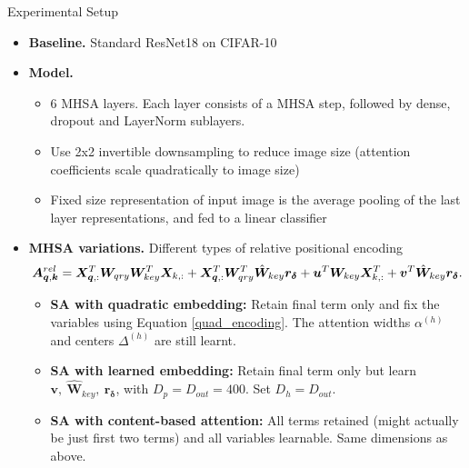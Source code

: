 \documentclass[9pt]{beamer}
\newcommand{\mb}{\bm}
\begin{document}
\begin{frame}{Experimental Setup}
\begin{itemize}
\item \textbf{Baseline.} Standard ResNet18 on CIFAR-10

\vspace{.02in}
\item \textbf{Model.}
\begin{itemize}
    \item 6 MHSA layers. Each layer consists of a MHSA step, followed by dense, dropout and LayerNorm sublayers.
    \item Use 2x2 invertible downsampling to reduce image size (attention coefficients scale quadratically to image size)
    \item Fixed size representation of input image is the average pooling of the last layer representations, and fed to a linear classifier
\end{itemize}

\vspace{.02in}
\item \textbf{MHSA variations.} Different types of relative positional encoding
\begin{equation*}
    \mb A^{rel}_{\mb q, \mb k} = 
        \mb X_{\mb q,:}^T \WW \mb X_{k,:}
        + \mb X_{\mb q,:}^T \mb W_{qry}^T\hat{\mb W}_{key} \mb r_{\mb \delta}
        + \mb u^T \mb W_{key} \mb X^T_{k,:}
        + \mb v^T \hat{\mb W}_{key} \mb r_{\bm\delta}.
    \vspace{-.12in}
\end{equation*}
\begin{itemize}
    \item \textbf{SA with quadratic embedding:}  Retain final term only and fix the variables using Equation \eqref{quad_encoding}. The attention widths $\alpha^{(h)}$ and centers $\varDelta^{(h)}$ are still learnt.
    \item \textbf{SA with learned embedding:} Retain final term only but learn $\mathbf v,\ \hat{\mathbf W}_{key},\ \mathbf r_{\bm \delta}$, with $D_p=D_{out}=400$. Set $D_h=D_{out}$.
    \item \textbf{SA with content-based attention:} All terms retained (might actually be just first two terms) and all variables learnable. Same dimensions as above.
\end{itemize}
\end{itemize}
\end{frame}
\end{document}
